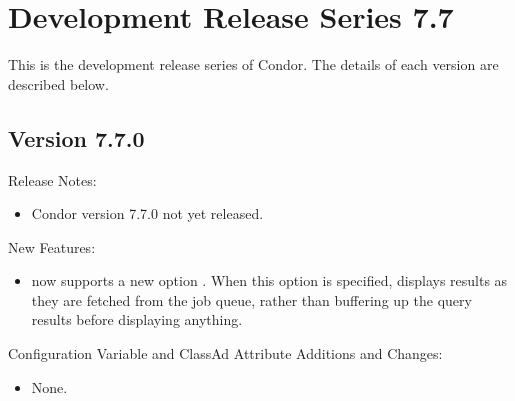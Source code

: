 
\section{\label{sec:History-7-7}Development Release Series 7.7}

This is the development release series of Condor.
The details of each version are described below.

\subsection*{\label{sec:New-7-7-0}Version 7.7.0}

\noindent Release Notes:

\begin{itemize}

\item Condor version 7.7.0 not yet released.

\end{itemize}


\noindent New Features:

\begin{itemize}

\item {} now supports a new option .
  When this option is specified,  displays results as they
  are fetched from the job queue, rather than buffering up the query
  results before displaying anything.

\end{itemize}

\noindent Configuration Variable and ClassAd Attribute Additions and Changes:

\begin{itemize}

\item None.

\end{itemize}

